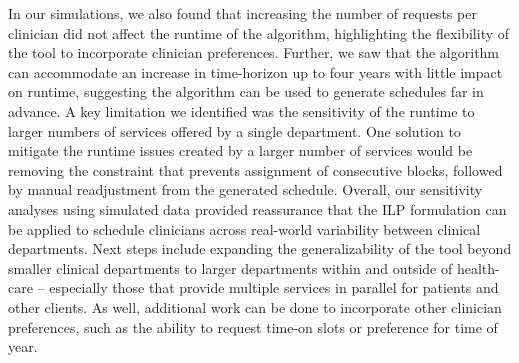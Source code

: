 In our simulations, we also found that increasing the number of requests per
clinician did not affect the runtime of the algorithm, highlighting the
flexibility of the tool to incorporate clinician preferences. Further, we saw
that the algorithm can accommodate an increase in time-horizon up to four years
with little impact on runtime, suggesting the algorithm can be used to generate
schedules far in advance. A key limitation we identified was the sensitivity
of the runtime to larger numbers of services offered by a single department. 
One solution to mitigate the runtime issues created by a
larger number of services would be removing the constraint that prevents
assignment of consecutive blocks, followed by manual readjustment from the
generated schedule.
Overall, our sensitivity analyses using simulated data provided reassurance that
the ILP formulation can be applied to schedule clinicians across real-world
variability between clinical departments.
Next steps include expanding the generalizability of the tool beyond smaller
clinical departments to larger departments within and outside of health-care --
especially those that provide multiple services in parallel for patients and
other clients. As well, additional work can be done to incorporate other
clinician preferences, such as the ability to request time-on slots or preference
for time of year.
